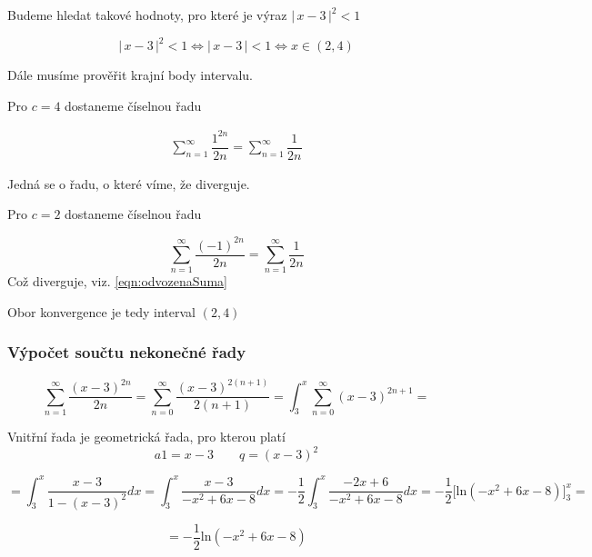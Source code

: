 \noindent Budeme hledat takové hodnoty, pro které je výraz $\big |\,x-3\,\big |^{2} < 1$

\begin{displaymath}
\big |\,x-3\,\big |^{2} < 1\Leftrightarrow \big |\,x-3\,\big | < 1 \Leftrightarrow x \in (2, 4)
\end{displaymath}

\noindent Dále musíme prověřit krajní body intervalu.
\vspace{10px}

\noindent Pro $c = 4$ dostaneme číselnou řadu

\begin{eqnarray}
\sum_{n=1}^{\infty} \dfrac{1^{2n}}{2n} = \sum_{n=1}^{\infty} \dfrac{1}{2n}
\label{eqn:odvozenaSuma}
\end{eqnarray}

\noindent Jedná se o řadu, o které víme, že diverguje.
\vspace{10px}

\noindent Pro $c = 2$ dostaneme číselnou řadu

\begin{displaymath}
\sum_{n=1}^{\infty} \dfrac{(-1)^{2n}}{2n} = \sum_{n=1}^{\infty} \dfrac{1}{2n}
\end{displaymath}
\noindent Což diverguje, viz. \ref{eqn:odvozenaSuma}

\vspace{10px}

\noindent Obor konvergence je tedy interval $(2, 4)$

\subsubsection{Výpočet součtu nekonečné řady}

\begin{displaymath}
\sum_{n=1}^{\infty} \dfrac{(x - 3)^{2n}}{2n} = \sum_{n=0}^{\infty} \dfrac{(x - 3)^{2(n + 1)}}{2(n + 1)} = \int_{3}^{x} \sum_{n=0}^{\infty} (x - 3)^{2n + 1} =
\end{displaymath}

Vnitřní řada je geometrická řada, pro kterou platí
\begin{displaymath}
a1 = x - 3 \qquad q = (x - 3)^2
\end{displaymath}

\begin{displaymath}
= \int_{3}^{x} \dfrac{x - 3}{1 - (x - 3)^2}dx =  \int_{3}^{x} \dfrac{x - 3}{- x^2+6x-8}dx = - \frac{1}{2}  \int_{3}^{x} \dfrac{-2x + 6}{- x^2+6x-8}dx =- \frac{1}{2} \Big [  \mbox{ln}(-x^2 + 6x - 8) \Big ]_3^x =
\end{displaymath}

\begin{displaymath}
= - \frac{1}{2} \mbox{ln}(-x^2 + 6x - 8)
\end{displaymath}



